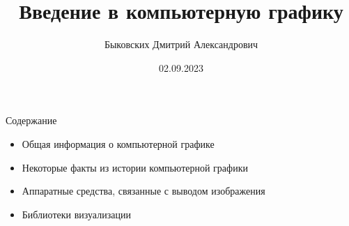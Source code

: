 \documentclass{beamer}
\title[Введение в КГ]{Введение в компьютерную графику}
\author[Быковских Д.А.]{Быковских Дмитрий Александрович}
\date{02.09.2023}
\begin{document}
	\begin{frame}
		\titlepage
	\end{frame}
	\begin{frame}{Содержание}
		\begin{itemize}
			\item 
			Общая информация о компьютерной графике
			\item
			Некоторые факты из истории компьютерной графики
			\item
			Аппаратные средства, связанные с выводом изображения
			\item 
			Библиотеки визуализации
		\end{itemize}
	\end{frame}
\end{document}
